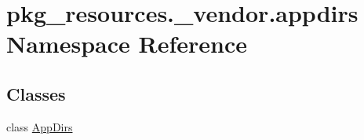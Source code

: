 \hypertarget{namespacepkg__resources_1_1__vendor_1_1appdirs}{}\section{pkg\+\_\+resources.\+\_\+vendor.\+appdirs Namespace Reference}
\label{namespacepkg__resources_1_1__vendor_1_1appdirs}
\subsection*{Classes}
\begin{DoxyCompactItemize}
\item 
class \hyperlink{classpkg__resources_1_1__vendor_1_1appdirs_1_1AppDirs}{App\+Dirs}
\end{DoxyCompactItemize}
